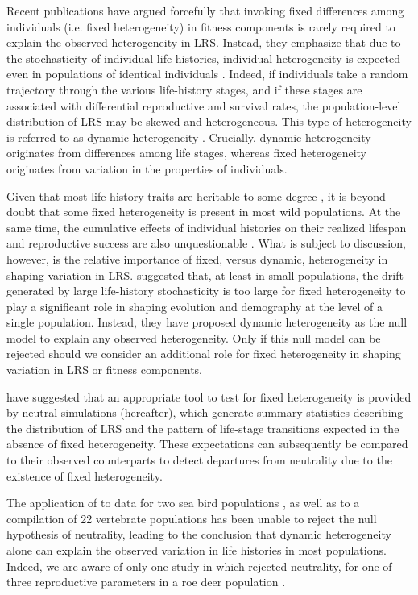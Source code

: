 Recent publications \parencite{Tuljapurkar2009,Steiner2010,Orzack2011,Steiner2012} have argued forcefully that invoking fixed differences among individuals (i.e. fixed heterogeneity) in fitness components is rarely required to explain the observed heterogeneity in LRS. Instead, they emphasize that due to the stochasticity of individual life histories, individual heterogeneity is expected even in populations of identical individuals \parencite{Caswell2011}. Indeed, if individuals take a random trajectory through the various life-history stages, and if these stages are associated with differential reproductive and survival rates, the population-level distribution of LRS may be skewed and heterogeneous. This type of heterogeneity is referred to as dynamic heterogeneity \parencite{Tuljapurkar2009}. Crucially, dynamic heterogeneity originates from differences among life stages, whereas fixed heterogeneity originates from variation in the properties of individuals.

Given that most life-history traits are heritable to some degree \parencite{Mousseau1987, Postma2014}, it is beyond doubt that some fixed heterogeneity is present in most wild populations. At the same time, the cumulative effects of individual histories on their realized lifespan and reproductive success are also unquestionable \parencite{Caswell2011}. What is subject to discussion, however, is the relative importance of fixed, versus dynamic, heterogeneity in shaping variation in LRS. \cite{Steiner2012} suggested that, at least in small populations, the drift generated by large life-history stochasticity is too large for fixed heterogeneity to play a significant role in shaping evolution and demography at the level of a single population. Instead, they have proposed dynamic heterogeneity as the null model to explain any observed heterogeneity. Only if this null model can be rejected should we consider an additional role for fixed heterogeneity in shaping variation in LRS or fitness components. 

\cite{Tuljapurkar2009} have suggested that an appropriate tool to test for fixed heterogeneity is provided by neutral simulations (\NSM hereafter), which generate summary statistics describing the distribution of LRS and the pattern of life-stage transitions expected in the absence of fixed heterogeneity. These expectations can subsequently be compared to their observed counterparts to detect departures from neutrality due to the existence of fixed heterogeneity. 

The application of \NSM to data for two sea bird populations \parencite{Steiner2010,Orzack2011}, as well as to a compilation of 22 vertebrate populations \parencite{Tuljapurkar2009} has been unable to reject the null hypothesis of neutrality, leading to the conclusion that dynamic heterogeneity alone can explain the observed variation in life histories in most populations. Indeed, we are aware of only one study in which \NSM rejected neutrality, for one of three reproductive parameters in a roe deer population \parencite{Plard2012}. 

